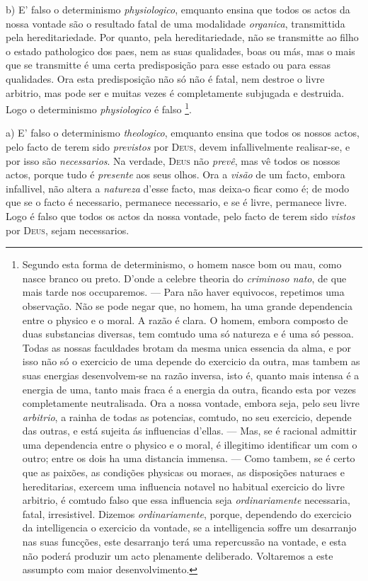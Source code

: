 b) E' falso o determinismo \emph{physiologico}, emquanto ensina que todos os actos da nossa vontade são o resultado fatal de uma modalidade \emph{organica}, transmittida pela hereditariedade. Por quanto, pela hereditariedade, não se transmitte ao filho o estado pathologico dos paes, nem as suas qualidades, boas ou más, mas o mais que se transmitte é uma certa predisposição para esse estado ou para essas qualidades. Ora esta predisposição não só não é fatal, nem destroe o livre arbitrio, mas pode ser e muitas vezes é completamente subjugada e destruida. Logo o determinismo \emph{physiologico} é falso \footnote{Segundo esta forma de determinismo, o homem nasce bom ou mau, como nasce branco ou preto. D'onde a celebre theoria do \emph{criminoso nato}, de que mais tarde nos occuparemos. --- Para não haver equivocos, repetimos uma observação. Não se pode negar que, no homem, ha uma grande dependencia entre o physico e o moral. A razão é clara. O homem, embora composto de duas substancias diversas, tem comtudo uma só natureza e é uma só pessoa. Todas as nossas faculdades brotam da mesma unica essencia da alma, e por isso não só o exercicio de uma depende do exercicio da outra, mas tambem as suas energias desenvolvem-se na razão inversa, isto é, quanto mais intensa é a energia de uma, tanto mais fraca é a energia da outra, ficando esta por vezes completamente neutralisada. Ora a nossa vontade, embora seja, pelo seu livre \emph{arbitrio}, a rainha de todas as potencias, comtudo, no seu exercicio, depende das outras, e está sujeita ás influencias d'ellas. --- Mas, se é racional admittir uma dependencia entre o physico e o moral, é illegitimo identificar um com o outro; entre os dois ha uma distancia immensa. --- Como tambem, se é certo que as paixões, as condições physicas ou moraes, as disposições naturaes e hereditarias, exercem uma influencia notavel no habitual exercicio do livre arbitrio, é comtudo falso que essa influencia seja \emph{ordinariamente} necessaria, fatal, irresistivel. Dizemos \emph{ordinariamente}, porque, dependendo do exercicio da intelligencia o exercicio da vontade, se a intelligencia soffre um desarranjo nas suas funcções, este desarranjo terá uma repercussão na vontade, e esta não poderá produzir um acto plenamente deliberado. Voltaremos a este assumpto com maior desenvolvimento.}.


 

a) E' falso o determinismo \emph{theologico}, emquanto ensina que todos os nossos actos, pelo facto de terem sido \emph{previstos} por \textsc{Deus}, devem infallivelmente realisar-se, e por isso são \emph{necessarios}. Na verdade, \textsc{Deus} não \emph{prevê}, mas vê todos os nossos actos, porque tudo é \emph{presente} aos seus olhos. Ora a \emph{visão} de um facto, embora infallivel, não altera a \emph{natureza} d'esse facto, mas deixa-o ficar como é; de modo que se o facto é necessario, permanece necessario, e se é livre, permanece livre. Logo é falso que todos os actos da nossa vontade, pelo facto de terem sido \emph{vistos} por \textsc{Deus}, sejam necessarios.

